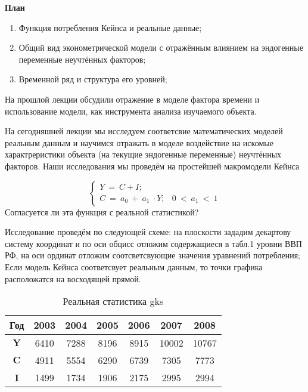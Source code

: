 \documentclass[12pt,a4paper]{article}
\author{GH-TIMe, little KoryakinAK}
\begin{document}
\begin{center}
\textbf{План}
\end{center}

\begin{enumerate}
\item Функция потребления Кейнса и реальные данные;
\item Общий вид эконометрической модели с отражённым влиянием на эндогенные переменные неучтённых факторов;
\item Временной ряд и структура его уровней;
\end{enumerate}

	На прошлой лекции обсудили отражение в моделе фактора времени и использование модели, как инструмента анализа изучаемого объекта. 

	На сегодняшней лекции мы исследуем соответсвие математических моделей реальным данным и научимся отражать в моделе воздействие на искомые характреристики объекта (на текущие эндогенные переменные) неучтённых факторов. Наши исследования мы проведём на простейшей макромодели Кейнса


\begin{equation}
\begin{cases}
Y\ =\ C+I; & \\
C\ =\ a_{0} \ +\ a_{1} \ \cdot Y; & 0\ < \ a_{1} \ < \ 1
\end{cases}
\end{equation}
	Согласуется ли эта функция с реальной статистикой?

	Исследование проведём по следующей схеме: на плоскости зададим декартову систему координат и по оси обцисс отложим содержащиеся в табл.1 уровни ВВП РФ, на оси ординат отложим соотсветсвующие значения уравнений потребления; Если модель Кейнса соответсвует реальным данным, то точки графика расположатся на восходящей прямой. 
\begin{table}[!h]
        \centering  
\begin{tabular}{|c|c|c|c|c|c|c|}
\hline 
 \textbf{Год} & \textbf{2003} & \textbf{2004} & \textbf{2005} & \textbf{2006} & \textbf{2007} & \textbf{2008} \\
\hline 
 $\displaystyle \textbf{Y}$ & 6410 & 7288 & 8196 & 8915 & 10002 & 10767 \\
\hline 
 $\displaystyle \textbf{C}$ & 4911 & 5554 & 6290 & 6739 & 7305 & 7773 \\
\hline 
 $\displaystyle \textbf{I}$ & 1499 & 1734 & 1906 & 2175 & 2995 & 2994 \\
 \hline
\end{tabular}
\caption{Реальная статистика gks}
        \end{table}
\end{document}
